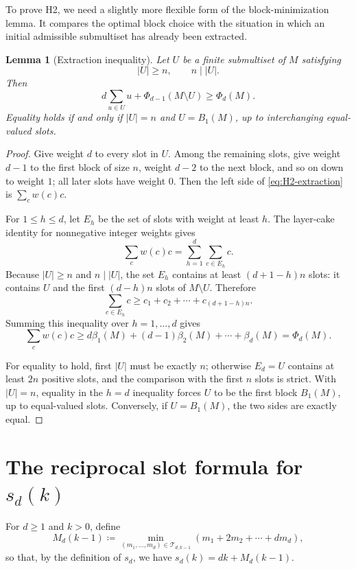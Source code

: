 \documentclass[11pt]{amsart}
\newtheorem{lemma}[theorem]{Lemma}
\theoremstyle{definition}
\newcommand{\Tdk}{\mathcal{T}_{d,k-1}}
\begin{document}
To prove H2, we need a slightly more flexible form of the block-minimization lemma.
It compares the optimal block choice with the situation in which an initial
admissible submultiset has already been extracted.

\begin{lemma}[Extraction inequality]\label{lem:H2-extraction}
Let $U$ be a finite submultiset of $M$ satisfying
\[
  |U|\geq n,
  \qquad n\mid |U|.
\]
Then
\begin{equation}\label{eq:H2-extraction}
  d\sum_{u\in U}u+\Phi_{d-1}(M\setminus U)\geq \Phi_d(M).
\end{equation}
Equality holds if and only if $|U|=n$ and $U=B_1(M)$, up to interchanging equal-valued slots.
\end{lemma}

\begin{proof}
Give weight $d$ to every slot in $U$.
Among the remaining slots, give weight $d-1$ to the first block of size $n$, weight $d-2$ to the next block,
and so on down to weight $1$; all later slots have weight $0$.
Then the left side of \eqref{eq:H2-extraction} is $\sum_c w(c)c$.

For $1\leq h\leq d$, let $E_h$ be the set of slots with weight at least $h$.
The layer-cake identity for nonnegative integer weights gives
\[
  \sum_c w(c)c=\sum_{h=1}^d\sum_{c\in E_h}c.
\]
Because $|U|\geq n$ and $n\mid |U|$, the set $E_h$ contains at least $(d+1-h)n$ slots:
it contains $U$ and the first $(d-h)n$ slots of $M\setminus U$.  Therefore
\[
  \sum_{c\in E_h}c\geq c_1+c_2+\cdots+c_{(d+1-h)n}.
\]
Summing this inequality over $h=1,\ldots,d$ gives
\[
  \sum_c w(c)c\geq d\beta_1(M)+(d-1)\beta_2(M)+\cdots+\beta_d(M)=\Phi_d(M).
\]

For equality to hold, first $|U|$ must be exactly $n$;
otherwise $E_d=U$ contains at least $2n$ positive slots,
and the comparison with the first $n$ slots is strict.
With $|U|=n$, equality in the $h=d$ inequality forces $U$ to be the first block $B_1(M)$,
up to equal-valued slots.  Conversely, if $U=B_1(M)$, the two sides are exactly equal.
\end{proof}


\section{The reciprocal slot formula for $s_d(k)$}
For $d\geq 1$ and $k>0$, define
\[
  M_d(k-1) \coloneq \min_{(m_1,\ldots,m_d)\in\Tdk}\left(m_1+2m_2+\cdots+dm_d\right),
\]
so that, by the definition of $s_d$, we have $s_d(k)=dk+M_d(k-1)$.
\end{document}
